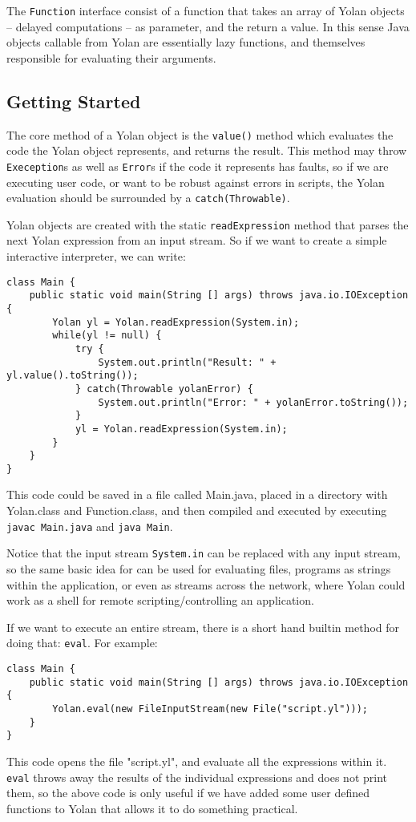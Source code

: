 \documentclass[11pt]{report}
\begin{document}
The \verb|Function| interface consist of a function that takes an array of Yolan objects -- delayed computations -- as parameter, and the return a value. In this sense Java objects callable from Yolan are essentially lazy functions, and themselves responsible for evaluating their arguments.

\subsection{Getting Started}
The core method of a Yolan object is the \verb|value()| method which evaluates the code the Yolan object represents, and returns the result. This method may throw \verb|Exeception|s as well as \verb|Error|s if the code it represents has faults, so if we are executing user code, or want to be robust against errors in scripts, the Yolan evaluation should be surrounded by a \verb|catch(Throwable)|.

Yolan objects are created with the static \verb|readExpression| method that parses the next Yolan expression from an input stream. So if we want to create a simple interactive interpreter, we can write: \begin{lstlisting}
class Main {
    public static void main(String [] args) throws java.io.IOException {
        Yolan yl = Yolan.readExpression(System.in);
        while(yl != null) {
            try {
                System.out.println("Result: " + yl.value().toString());
            } catch(Throwable yolanError) {
                System.out.println("Error: " + yolanError.toString());
            }
            yl = Yolan.readExpression(System.in);
        }
    }
}\end{lstlisting} 

This code could be saved in a file called Main.java, placed in a directory with Yolan.class and Function.class, and then compiled and executed by executing \verb|javac Main.java| and \verb|java Main|.

Notice that the input stream \verb|System.in| can be replaced with any input stream, so the same basic idea for can be used for evaluating files, programs as strings within the application, or even as streams across the network, where Yolan could work as a shell for remote scripting/controlling an application.

If we want to execute an entire stream, there is a short hand builtin method for doing that: \verb|eval|. For example:
\begin{lstlisting}
class Main {
    public static void main(String [] args) throws java.io.IOException {
        Yolan.eval(new FileInputStream(new File("script.yl")));
    }
}
\end{lstlisting}
This code opens the file "script.yl", and evaluate all the expressions within it. 
\verb|eval| throws away the results of the individual expressions and does not print them,
so the above code is only useful if we have added some user defined functions to Yolan that allows it to do something practical.
\end{document}
